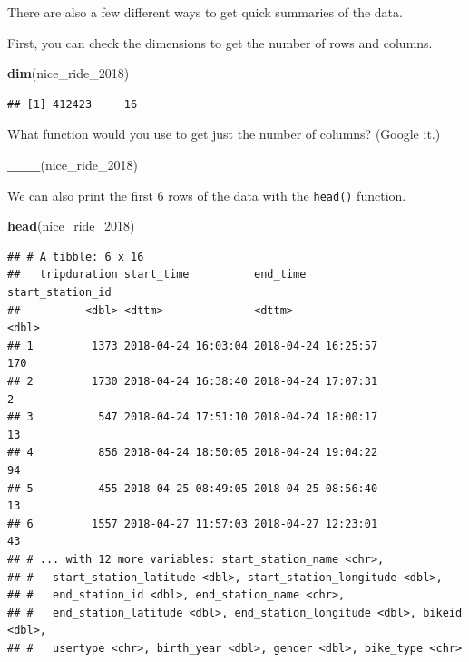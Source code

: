 \documentclass[]{book}
\newenvironment{Shaded}{\begin{snugshade}}{\end{snugshade}}
\newcommand{\KeywordTok}[1]{\textcolor[rgb]{0.13,0.29,0.53}{\textbf{#1}}}
\newcommand{\DecValTok}[1]{\textcolor[rgb]{0.00,0.00,0.81}{#1}}
\newcommand{\NormalTok}[1]{#1}
\begin{document}
There are also a few different ways to get quick summaries of the data.

First, you can check the dimensions to get the number of rows and
columns.

\begin{Shaded}
\begin{Highlighting}[]
\KeywordTok{dim}\NormalTok{(nice_ride_}\DecValTok{2018}\NormalTok{)}
\end{Highlighting}
\end{Shaded}

\begin{verbatim}
## [1] 412423     16
\end{verbatim}

What function would you use to get just the number of columns? (Google
it.)

\begin{Shaded}
\begin{Highlighting}[]
\KeywordTok{___}\NormalTok{(nice_ride_}\DecValTok{2018}\NormalTok{)}
\end{Highlighting}
\end{Shaded}

We can also print the first 6 rows of the data with the \texttt{head()}
function.

\begin{Shaded}
\begin{Highlighting}[]
\KeywordTok{head}\NormalTok{(nice_ride_}\DecValTok{2018}\NormalTok{)}
\end{Highlighting}
\end{Shaded}

\begin{verbatim}
## # A tibble: 6 x 16
##   tripduration start_time          end_time            start_station_id
##          <dbl> <dttm>              <dttm>                         <dbl>
## 1         1373 2018-04-24 16:03:04 2018-04-24 16:25:57              170
## 2         1730 2018-04-24 16:38:40 2018-04-24 17:07:31                2
## 3          547 2018-04-24 17:51:10 2018-04-24 18:00:17               13
## 4          856 2018-04-24 18:50:05 2018-04-24 19:04:22               94
## 5          455 2018-04-25 08:49:05 2018-04-25 08:56:40               13
## 6         1557 2018-04-27 11:57:03 2018-04-27 12:23:01               43
## # ... with 12 more variables: start_station_name <chr>,
## #   start_station_latitude <dbl>, start_station_longitude <dbl>,
## #   end_station_id <dbl>, end_station_name <chr>,
## #   end_station_latitude <dbl>, end_station_longitude <dbl>, bikeid <dbl>,
## #   usertype <chr>, birth_year <dbl>, gender <dbl>, bike_type <chr>
\end{verbatim}
\end{document}

